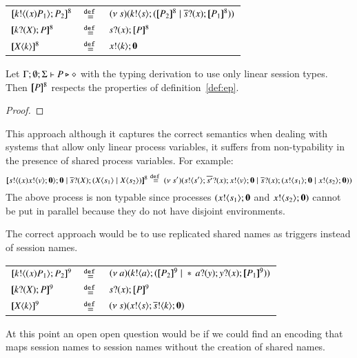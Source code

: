 \begin{definition}

	\begin{tabular}{lcl}
		$[\!\![k ! \langle (x)P_1 \rangle ; P_2]\!\!]^{8}$ &$\stackrel{\mathtt{def}\ }{=}$& $ \newsp{s}{\bout{k}{s} (\map{P_2}^8 \Par \binp{\dual{s}}{x} \map{P_1}^8)} $\\
		$[\!\![k ? (X) ; P]\!\!]^{8}$ &$\stackrel{\mathtt{def}\ }{=}$& $s ? (x) ; [\!\![P]\!\!]^8$\\
		$[\!\![X\langle k \rangle]\!\!]^8$ &$\stackrel{\mathtt{def}\ }{=}$& $x ! \langle k \rangle ; \mathbf{0}$
	\end{tabular}
\end{definition}

\begin{proposition}
	Let $\Gamma;\emptyset;\Sigma \vdash P \triangleright \diamond$ with
	the typing derivation to use only linear session types. Then
	$[\!\![P]\!\!]^8$ respects the properties of definition~\ref{def:ep}.
\end{proposition}

\begin{proof}
\end{proof}

This approach although it captures the correct semantics when
dealing with systems that allow only linear process variables,
it suffers from non-typability in the presence
of shared process variables. For example:
\[
	[\!\![s ! \langle (x)x ! \langle v \rangle ;\mathbf{0} \rangle ; \mathbf{0} \;|\; \overline{s} ? (X) ; (X\langle s_1 \rangle \;|\; X\langle s_2 \rangle)]\!\!]^8 \stackrel{\mathtt{def}\ }{=}
	(\nu\ s')(s ! \langle s' \rangle ; \overline{s'} ? (x) ; x ! \langle v \rangle ; \mathbf{0} \;|\; \overline{s} ? (x) ; (x ! \langle s_1 \rangle ; \mathbf{0} \;|\; x ! \langle s_2 \rangle ; \mathbf{0}))
\]
The above process is non typable since processes $(x ! \langle s_1 \rangle ; \mathbf{0}$ and $x ! \langle s_2 \rangle ; \mathbf{0})$
cannot be put in parallel because they do not have disjoint environments.

The correct approach would be to use replicated shared names
as triggers instead of session names. 

\begin{definition}

	\begin{tabular}{lcl}
		$[\!\![k ! \langle (x)P_1 \rangle ; P_2]\!\!]^{9}$ &$\stackrel{\mathtt{def}\ }{=}$& $ \newsp{a}{\bout{k}{a} (\map{P_2}^9 \Par \repl{} \binp{a}{y} \binp{y}{x} \map{P_1}^9)} $\\
		$[\!\![k ? (X) ; P]\!\!]^{9}$ &$\stackrel{\mathtt{def}\ }{=}$& $s ? (x) ; [\!\![P]\!\!]^9$\\
		$[\!\![X\langle k \rangle]\!\!]^9$ &$\stackrel{\mathtt{def}\ }{=}$& $(\nu\ s)(x ! \langle s \rangle ; \overline{s} ! \langle k \rangle ; \mathbf{0})$
	\end{tabular}
\end{definition}

At this point an open open question would be if
we could find an encoding that maps
session names to session names without the creation
of shared names.



